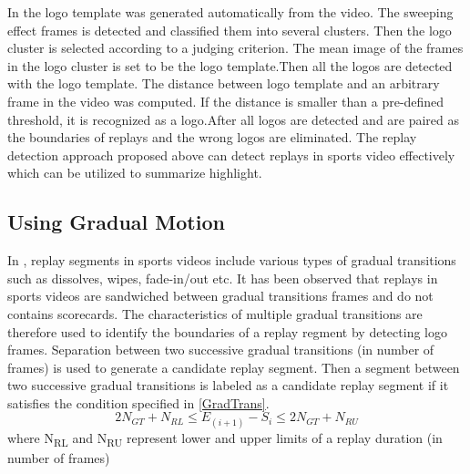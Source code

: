 In \cite{4036924} the logo template was generated automatically from the video. The sweeping effect frames is detected and classified them into several clusters. Then the logo cluster is selected according to a judging criterion. The mean image of the frames in the logo cluster is set to be the logo template.Then all the logos are detected with the logo template. The distance between logo template and an arbitrary frame in the video was computed. If the distance is smaller than a pre-defined threshold, it is recognized as a logo.After all logos are detected and are paired as the boundaries of replays and the wrong logos are eliminated. The replay detection approach proposed above can detect replays in sports video effectively  which can be utilized to summarize highlight.
 

\subsection{Using Gradual Motion}
In \cite{7479531}, replay segments in sports videos include various types of gradual transitions such as dissolves, wipes, fade-in/out etc. It has been observed that replays in sports videos are sandwiched between gradual transitions frames and do not contains scorecards. The characteristics of multiple gradual transitions are therefore used to identify the boundaries of a replay regment by detecting logo frames. Separation between two successive gradual transitions (in number of frames) is used to generate a candidate replay segment. Then a segment between two successive gradual transitions is labeled as a candidate replay segment if it satisfies the condition specified in \ref{GradTrans}.
\begin{equation}
\label{GradTrans}
2N_{GT}+N_{RL}\leq E_{(i+1)}-S_{i}\leq 2N_{GT}+N_{RU}
\end{equation}
where N\textsubscript{RL} and N\textsubscript{RU} represent lower and upper limits of a replay duration (in number of frames)

